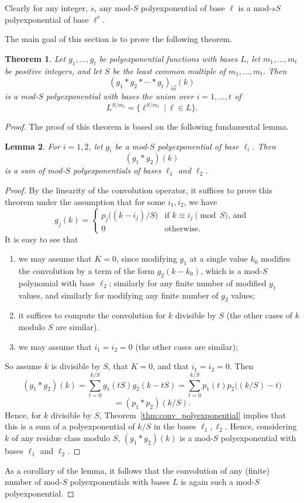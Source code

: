 \documentclass{memo-l}
\theoremstyle{plain}
\newtheorem{theorem}{Theorem}[section]
\newtheorem{lemma}[theorem]{Lemma}
\theoremstyle{definition}
\numberwithin{section}{chapter}
\numberwithin{equation}{chapter}
\theoremstyle{plain}
\theoremstyle{definition}
\begin{document}
Clearly for any integer, $s$, any mod-$S$ polyexponential of base $\ell$ 
is a mod-$sS$ polyexponential of base $\ell^s$.

The main goal of this section is to prove the following theorem.

\begin{theorem}
\label{th:polyexp-m-conv}
Let $g_1,\ldots,g_t$ be polyexponential functions with bases $L$,
let $m_1,\ldots,m_t$ be positive integers, and let
$S$ be the least common multiple of $m_1,\ldots,m_t$.
Then
$$
(g_1 \ast g_2 \ast \cdots \ast g_t)_{\vec m}(k)
$$
is a mod-$S$ polyexponential with bases the union over $i=1,\ldots,t$
of
$$
L^{S/m_i} = \{ \ell^{S/m_i} \ | \  \ell\in L \}.
$$
\end{theorem}
\begin{proof}
The proof of this theorem is based on the following fundamental lemma.

\begin{lemma}
For $i=1,2$, let $g_i$ be a mod-$S$ polyexponential of
base $\ell_i$.  
Then
$$
(g_1 \ast g_2)(k)
$$
is a sum of mod-$S$ polyexponentials of
bases $\ell_1$ and $\ell_2$.
\end{lemma}
\begin{proof}
By the linearity of the convolution operator, it suffices to prove this
theorem under the assumption that for some $i_1,i_2$, we have
$$
g_j(k) = 
\left\{ 
\begin{array}{ll}  p_j\bigl(  (k-i_j)/S \bigr)  & 
\mbox{if $k\equiv i_j\pmod{S}$, and} \\
0 & \mbox{otherwise.}
\end{array}\right. 
$$
It is easy to see that 
\begin{enumerate}
\item we may assume that $K=0$, since modifying $g_1$ at a single value
$k_0$
modifies the convolution by a term
of the form $g_2(k-k_0)$, which is a
mod-$S$ polynomial with base $\ell_2$; similarly for any finite
number of modified $g_1$ values, and similarly for modifying any finite
number of $g_2$ values;
\item 
it suffices to compute the convolution for $k$ divisible by $S$
(the other cases of $k$ modulo $S$ are similar).
\item we may assume that $i_1=i_2=0$ (the other cases are similar);
\end{enumerate}
So assume $k$ is divisible by $S$, that $K=0$, and that 
$i_1=i_2=0$.  
Then 
$$
(g_1 \ast g_2)(k)
=
\sum_{t=0}^{k/S} g_1(tS) g_2(k-tS)
=
\sum_{t=0}^{k/S} 
p_1(t) p_2\bigl((k/S)-t\bigr)
$$
$$
=(p_1 \ast p_2)(k/S).
$$
Hence, for $k$ divisible by $S$,
Theorem~\ref{thm:conv_polyexponential} implies that this is a sum
of a polyexponential of $k/S$ in the bases $\ell_1,\ell_2$.
Hence, considering $k$ of any residue class modulo $S$,
$(g_1\ast g_2)(k)$ is a mod-$S$ polyexponential with bases
$\ell_1$ and $\ell_2$.
\end{proof}
As a corollary of the lemma, it follows that the convolution of
any (finite) number of mod-$S$ polyexponentials with bases $L$
is again such a mod-$S$ polyexponential.


\end{proof}
\end{document}
